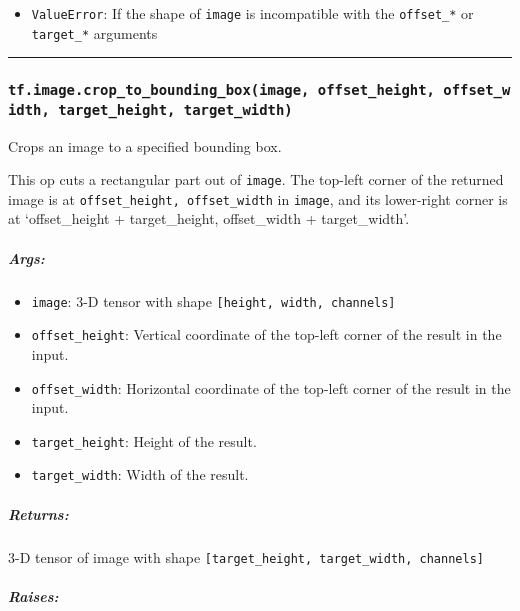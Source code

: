 \begin{itemize}
\tightlist
\item
  \texttt{ValueError}: If the shape of \texttt{image} is incompatible
  with the \texttt{offset\_*} or \texttt{target\_*} arguments
\end{itemize}

\begin{center}\rule{0.5\linewidth}{\linethickness}\end{center}

\subsubsection{\texorpdfstring{\texttt{tf.image.crop\_to\_bounding\_box(image,\ offset\_height,\ offset\_width,\ target\_height,\ target\_width)}
}{tf.image.crop\_to\_bounding\_box(image, offset\_height, offset\_width, target\_height, target\_width) }}\label{tf.image.cropux5ftoux5fboundingux5fboximage-offsetux5fheight-offsetux5fwidth-targetux5fheight-targetux5fwidth}

Crops an image to a specified bounding box.

This op cuts a rectangular part out of \texttt{image}. The top-left
corner of the returned image is at
\texttt{offset\_height,\ offset\_width} in \texttt{image}, and its
lower-right corner is at `offset\_height + target\_height, offset\_width
+ target\_width'.

\subparagraph{Args: }\label{args-11}

\begin{itemize}
\tightlist
\item
  \texttt{image}: 3-D tensor with shape
  \texttt{{[}height,\ width,\ channels{]}}
\item
  \texttt{offset\_height}: Vertical coordinate of the top-left corner of
  the result in the input.
\item
  \texttt{offset\_width}: Horizontal coordinate of the top-left corner
  of the result in the input.
\item
  \texttt{target\_height}: Height of the result.
\item
  \texttt{target\_width}: Width of the result.
\end{itemize}

\subparagraph{Returns: }\label{returns-11}

3-D tensor of image with shape
\texttt{{[}target\_height,\ target\_width,\ channels{]}}

\subparagraph{Raises: }\label{raises-3}

